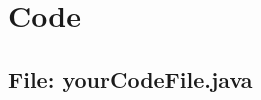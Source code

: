 \documentclass[12pt,a4paper]{report}
\theoremstyle{definition}
\begin{document}
\chapter{Code}


\begin{landscape}
\begin{multicols}{2}
\section{File: yourCodeFile.java}

\end{multicols}
\end{landscape}	

\end{document}
